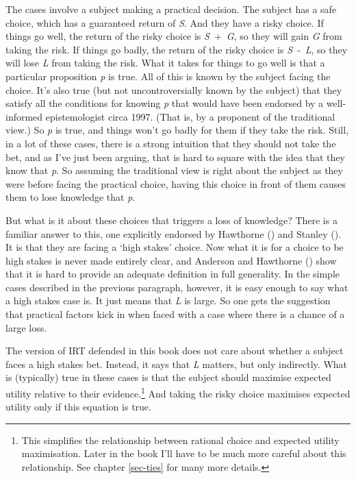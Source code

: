 \documentclass[
  12pt,
  letterpaper,
]{scrbook}
\begin{document}
The cases involve a subject making a practical decision. The subject has
a safe choice, which has a guaranteed return of \emph{S}. And they have
a risky choice. If things go well, the return of the risky choice is
\emph{S}~+~\emph{G}, so they will gain \emph{G} from taking the risk. If
things go badly, the return of the risky choice is \emph{S}~‑~\emph{L},
so they will lose \emph{L} from taking the risk. What it takes for
things to go well is that a particular proposition \emph{p} is true. All
of this is known by the subject facing the choice. It's also true (but
not uncontroversially known by the subject) that they satisfy all the
conditions for knowing \emph{p} that would have been endorsed by a
well-informed epistemologist circa 1997. (That is, by a proponent of the
traditional view.) So \emph{p} is true, and things won't go badly for
them if they take the risk. Still, in a lot of these cases, there is a
strong intuition that they should not take the bet, and as I've just
been arguing, that is hard to square with the idea that they know that
\emph{p}. So assuming the traditional view is right about the subject as
they were before facing the practical choice, having this choice in
front of them causes them to lose knowledge that \emph{p}.

But what is it about these choices that triggers a loss of knowledge?
There is a familiar answer to this, one explicitly endorsed by Hawthorne
() and Stanley
(). It is that they are facing a `high
stakes' choice. Now what it is for a choice to be high stakes is never
made entirely clear, and Anderson and Hawthorne
() show that it is hard to
provide an adequate definition in full generality. In the simple cases
described in the previous paragraph, however, it is easy enough to say
what a high stakes case is. It just means that \emph{L} is large. So one
gets the suggestion that practical factors kick in when faced with a
case where there is a chance of a large loss.

The version of IRT defended in this book does not care about whether a
subject faces a high stakes bet. Instead, it says that \emph{L} matters,
but only indirectly. What is (typically) true in these cases is that the
subject should maximise expected utility relative to their
evidence.\footnote{This simplifies the relationship between rational
  choice and expected utility maximisation. Later in the book I'll have
  to be much more careful about this relationship. See chapter
  \ref{sec-ties} for many more details.} And taking the risky choice
maximises expected utility only if this equation is true.
\end{document}
